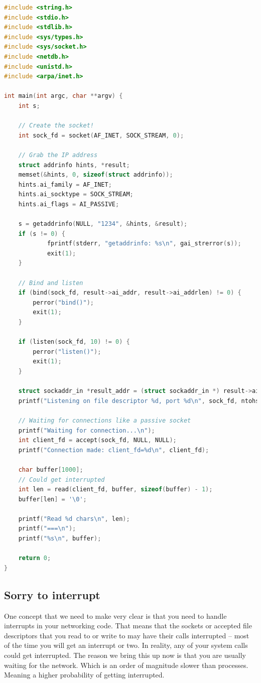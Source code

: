 \begin{lstlisting}[language=C]
#include <string.h>
#include <stdio.h>
#include <stdlib.h>
#include <sys/types.h>
#include <sys/socket.h>
#include <netdb.h>
#include <unistd.h>
#include <arpa/inet.h>

int main(int argc, char **argv) {
    int s;

    // Create the socket!
    int sock_fd = socket(AF_INET, SOCK_STREAM, 0);

    // Grab the IP address
    struct addrinfo hints, *result;
    memset(&hints, 0, sizeof(struct addrinfo));
    hints.ai_family = AF_INET;
    hints.ai_socktype = SOCK_STREAM;
    hints.ai_flags = AI_PASSIVE;

    s = getaddrinfo(NULL, "1234", &hints, &result);
    if (s != 0) {
            fprintf(stderr, "getaddrinfo: %s\n", gai_strerror(s));
            exit(1);
    }

    // Bind and listen
    if (bind(sock_fd, result->ai_addr, result->ai_addrlen) != 0) {
        perror("bind()");
        exit(1);
    }

    if (listen(sock_fd, 10) != 0) {
        perror("listen()");
        exit(1);
    }

    struct sockaddr_in *result_addr = (struct sockaddr_in *) result->ai_addr;
    printf("Listening on file descriptor %d, port %d\n", sock_fd, ntohs(result_addr->sin_port));

    // Waiting for connections like a passive socket
    printf("Waiting for connection...\n");
    int client_fd = accept(sock_fd, NULL, NULL);
    printf("Connection made: client_fd=%d\n", client_fd);

    char buffer[1000];
    // Could get interrupted
    int len = read(client_fd, buffer, sizeof(buffer) - 1);
    buffer[len] = '\0';

    printf("Read %d chars\n", len);
    printf("===\n");
    printf("%s\n", buffer);

    return 0;
}
\end{lstlisting}

\subsection{Sorry to interrupt}

One concept that we need to make very clear is that you need to handle interrupts in your networking code.
That means that the sockets or accepted file descriptors that you read to or write to may have their calls interrupted -- most of the time you will get an interrupt or two.
In reality, any of your system calls could get interrupted.
The reason we bring this up now is that you are usually waiting for the network.
Which is an order of magnitude slower than processes.
Meaning a higher probability of getting interrupted.

